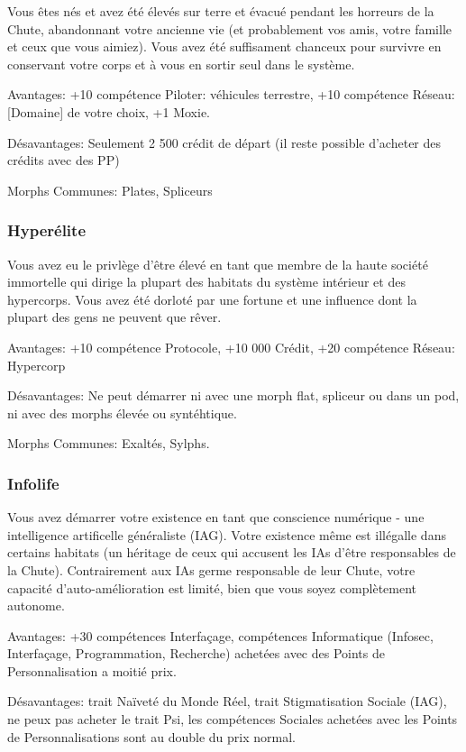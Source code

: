 Vous êtes nés et avez été élevés sur terre et évacué pendant les horreurs de la Chute, abandonnant votre ancienne vie (et probablement vos amis, votre famille et ceux que vous aimiez). Vous avez été suffisament chanceux pour survivre en conservant votre corps et à vous en sortir seul dans le système. 

Avantages: +10 compétence Piloter: véhicules terrestre, +10 compétence Réseau: [Domaine] de votre choix, +1 Moxie. 

Désavantages: Seulement 2 500 crédit de départ (il reste possible d'acheter des crédits avec des PP) 

Morphs Communes: Plates, Spliceurs 

\subsubsection{Hyperélite} \label{sec:hyperelite} 

Vous avez eu le privlège d'être élevé en tant que membre de la haute société immortelle qui dirige la plupart des habitats du système intérieur et des hypercorps. Vous avez été dorloté par une fortune et une influence dont la plupart des gens ne peuvent que rêver. 

Avantages: +10 compétence Protocole, +10 000 Crédit, +20 compétence Réseau: Hypercorp 

Désavantages: Ne peut démarrer ni avec une morph flat, spliceur ou dans un pod, ni avec des morphs élevée ou syntéhtique. 

Morphs Communes: Exaltés, Sylphs. 

\subsubsection{Infolife} \label{sec:infolife} 

Vous avez démarrer votre existence en tant que conscience numérique - une intelligence artificelle généraliste (IAG). Votre existence même est illégalle dans certains habitats (un héritage de ceux qui accusent les IAs d'être responsables de la Chute). Contrairement aux IAs germe responsable de leur Chute, votre capacité d'auto-amélioration est limité, bien que vous soyez complètement autonome. 

Avantages: +30 compétences Interfaçage, compétences Informatique (Infosec, Interfaçage, Programmation, Recherche) achetées avec des Points de Personnalisation a moitié prix. 

Désavantages: trait Naïveté du Monde Réel, trait Stigmatisation Sociale (IAG), ne peux pas acheter le trait Psi, les compétences Sociales achetées avec les Points de Personnalisations sont au double du prix normal. 

